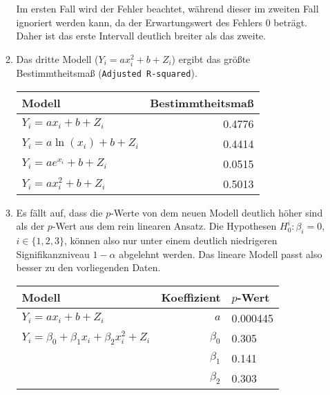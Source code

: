 \documentclass[a4paper]{scrartcl}
\def \blattnr {10}
\begin{document}
\begin{enumerate}[label=\bfseries \blattnr.\arabic*]
\begin{enumerate}
         Im ersten Fall wird der Fehler
         beachtet, während dieser im zweiten Fall ignoriert werden kann, da der
         Erwartungswert des Fehlers 0 beträgt. Daher ist das erste Intervall
         deutlich breiter als das zweite.
         \clearpage
     \item %
         Das dritte Modell ($Y_i = a x_i^2 + b + Z_i$) ergibt das größte
         Bestimmtheitsmaß (\texttt{Adjusted R-squared}).
         \begin{table}[h]
             \centering
             \begin{tabular}{l|r}
                 Modell & Bestimmtheitsmaß \\ \hline
                 $Y_i = a x_i + b + Z_i$      & \num{0.4776} \\
                 $Y_i = a \ln(x_i) + b + Z_i$ & \num{0.4414} \\
                 $Y_i = a e^{x_i} + b + Z_i$  & \num{0.0515} \\
                 $Y_i = a x_i^2 + b + Z_i$    & \num{0.5013} \\
             \end{tabular}
         \end{table}
     \item %
         Es fällt auf, dass die $p$-Werte von dem neuen Modell deutlich höher
         sind als der $p$-Wert aus dem rein linearen Ansatz.
         Die Hypothesen $H_0^i: \beta_i = 0$, $i \in \{1,2,3\}$, können also
         nur unter einem deutlich niedrigeren Signifikanzniveau $1 - \alpha$
         abgelehnt werden.
         Das lineare Modell passt also besser zu den vorliegenden Daten.
         \begin{table}[h]
             \centering
             \begin{tabular}{l|r|l}
                 Modell & Koeffizient & $p$-Wert \\ \hline
                 $Y_i = a x_i + b + Z_i$ & $a$ & \num{0.000445} \\ \hline
                 $Y_i = \beta_0 + \beta_1x_i + \beta_2x_i^2 + Z_i$ & $\beta_0$ & \num{0.305} \\
                                                                   & $\beta_1$ & \num{0.141} \\
                                                                   & $\beta_2$ & \num{0.303} \\
             \end{tabular}
         \end{table}


\end{enumerate}
\end{enumerate}
\end{document}
